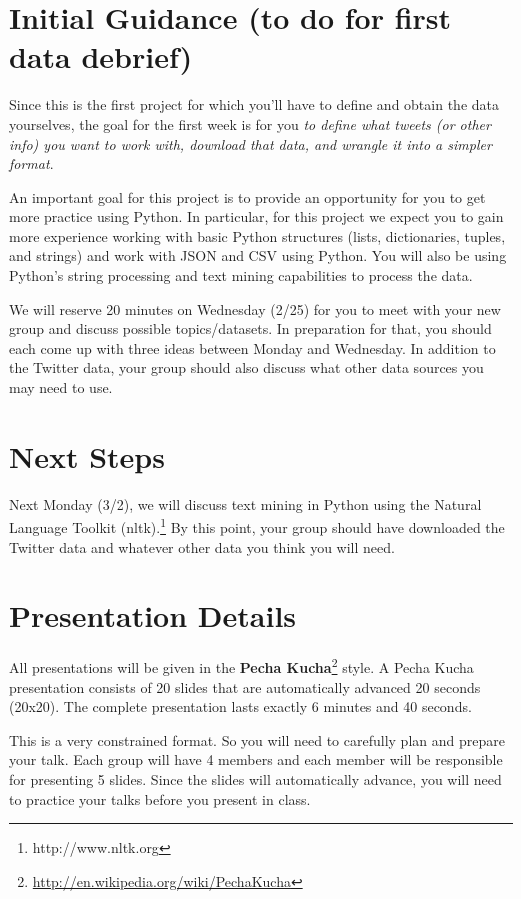 \documentclass[11pt, oneside]{article}   	%
\begin{document}
\section{Initial Guidance (to do for first data debrief)}

Since this is the first project for which you'll have to define and obtain the
data yourselves, the goal for the first week is for you \emph{to define what
tweets (or other info) you want to work with, download that data, and wrangle
it into a simpler format}. 

An important goal for this project is to provide an opportunity for you to
get more practice using Python.  In particular, for this project we expect
you to gain more experience working with basic Python structures (lists,
dictionaries, tuples, and strings) and work with JSON and CSV using Python.
You will also be using Python's string processing and text mining capabilities
to process the data.

We will reserve 20 minutes on Wednesday (2/25) for you to meet with your new
group and discuss possible topics/datasets. In preparation for that, you should
each come up with three ideas between Monday and Wednesday.  In addition to
the Twitter data, your group should also discuss what other data sources
you may need to use.

\section{Next Steps}

Next Monday (3/2), we will discuss text mining in Python using the Natural
Language Toolkit (nltk).\footnote{http://www.nltk.org} By this point, your
group should have downloaded the Twitter data and whatever other data you
think you will need.  

\section{Presentation Details}

All presentations will be given in the \textbf{Pecha
Kucha}\footnote{\url{http://en.wikipedia.org/wiki/PechaKucha}} style.  A Pecha
Kucha presentation consists of 20 slides that are automatically advanced 20
seconds (20x20).  The complete presentation lasts exactly 6 minutes and 40
seconds.

This is a very constrained format.  So you will need to carefully plan and
prepare your talk.  Each group will have 4 members and each member will
be responsible for presenting 5 slides.  Since the slides will automatically
advance, you will need to practice your talks before you present in class.
\end{document}
